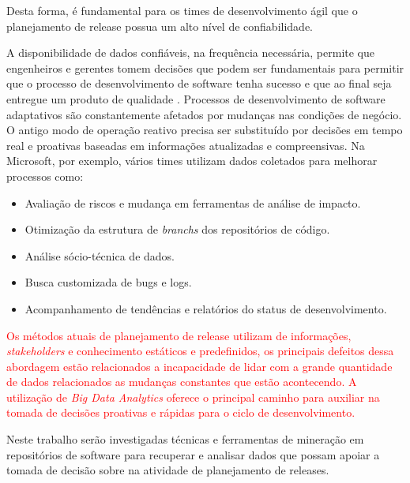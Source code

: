 Desta forma, é fundamental para os times de desenvolvimento ágil que o planejamento de release possua um alto nível de confiabilidade\cite{McDaid}.

A disponibilidade de dados confiáveis, na frequência necessária, permite que engenheiros e gerentes tomem decisões que podem ser fundamentais para permitir que o processo de desenvolvimento de software tenha sucesso e que ao final seja entregue um produto de qualidade \cite{codemine}. Processos de desenvolvimento
de software adaptativos são constantemente afetados por mudanças nas condições de negócio. O antigo modo de operação reativo precisa ser substituído por decisões em tempo real e proativas baseadas em informações atualizadas e compreensivas\cite{artAndScience}. Na Microsoft, por exemplo, vários times utilizam dados coletados para melhorar processos como:

\begin{itemize}
    \item Avaliação de riscos e mudança em ferramentas de análise de impacto.
    \item Otimização da estrutura de \textit{branchs} dos repositórios de código.
    \item Análise sócio-técnica de dados.
    \item Busca customizada de bugs e logs.
    \item Acompanhamento de tendências e relatórios do status de desenvolvimento.
\end{itemize}

\textcolor{red}{Os métodos atuais de planejamento de release utilizam de informações, \textit{stakeholders}
e conhecimento estáticos e predefinidos, os principais defeitos dessa abordagem
estão relacionados a incapacidade de lidar com a grande quantidade de dados
relacionados as mudanças constantes que estão acontecendo. A utilização de
\textit{Big Data Analytics} oferece o principal caminho para auxiliar na tomada
de decisões proativas e rápidas para o ciclo de desenvolvimento\cite{artAndScience}.}


Neste trabalho serão investigadas técnicas e ferramentas de mineração em repositórios de software para recuperar e analisar dados que possam apoiar a tomada de decisão sobre na atividade de planejamento de releases.


